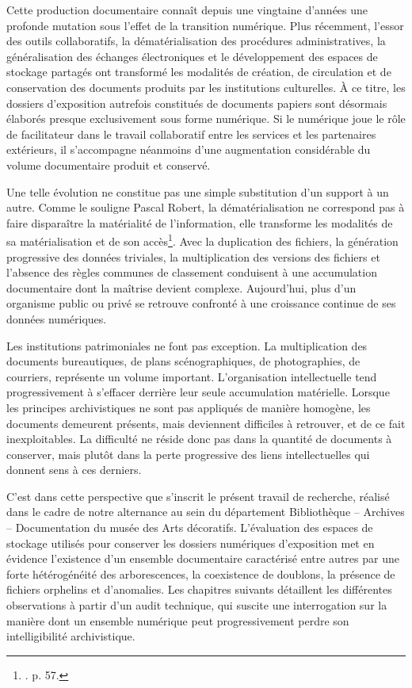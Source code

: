 Cette production documentaire connaît depuis une vingtaine d'années une profonde mutation sous l’effet de la transition numérique. Plus récemment, l’essor des outils collaboratifs, la dématérialisation des procédures administratives, la généralisation des échanges électroniques et le développement des espaces de stockage partagés ont transformé les modalités de création, de circulation et de conservation des documents produits par les institutions culturelles. À ce titre, les dossiers d’exposition autrefois constitués de documents papiers sont désormais élaborés presque exclusivement sous forme numérique. Si le numérique joue le rôle de facilitateur dans le travail collaboratif entre les services et les partenaires extérieurs, il s’accompagne néanmoins d’une augmentation considérable du volume documentaire produit et conservé.

Une telle évolution ne constitue pas une simple substitution d’un support à un autre. Comme le souligne Pascal Robert, la dématérialisation ne correspond pas à faire disparaître la matérialité de l’information, elle transforme les modalités de sa matérialisation et de son accès\footnote{\cite{robert-2004}. p. 57.}. Avec la duplication des fichiers, la génération progressive des données triviales, la multiplication des versions des fichiers et l’absence des règles communes de classement conduisent à une accumulation documentaire dont la maîtrise devient complexe. Aujourd’hui, plus d’un organisme public ou privé se retrouve confronté à une croissance continue de ses données numériques. 

Les institutions patrimoniales ne font pas exception. La multiplication des documents bureautiques, de plans scénographiques, de photographies, de courriers, représente un volume important. L’organisation intellectuelle tend progressivement à s’effacer derrière leur seule accumulation matérielle. Lorsque les principes archivistiques ne sont pas appliqués de manière homogène, les documents demeurent présents, mais deviennent difficiles à retrouver, et de ce fait inexploitables. La difficulté ne réside donc pas dans la quantité de documents à conserver, mais plutôt dans la perte progressive des liens intellectuelles qui donnent sens à ces derniers. 

C’est dans cette perspective que s’inscrit le présent travail de recherche, réalisé dans le cadre de notre alternance au sein du département Bibliothèque – Archives – Documentation du musée des Arts décoratifs. L’évaluation des espaces de stockage utilisés pour conserver les dossiers numériques d’exposition met en évidence l’existence d’un ensemble documentaire caractérisé entre autres par une forte hétérogénéité des arborescences, la coexistence de doublons, la présence de fichiers orphelins et d’anomalies. Les chapitres suivants détaillent les différentes observations à partir d’un audit technique, qui suscite une interrogation sur la manière dont un ensemble numérique peut progressivement perdre son intelligibilité archivistique.

